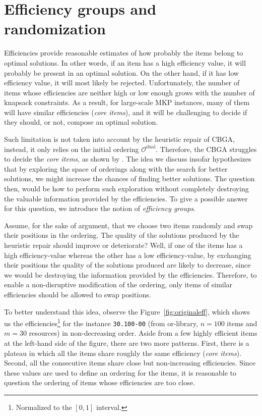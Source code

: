 \documentclass[3p,authoryear]{elsarticle}
\newcommand{\Ord}{\mathcal{O}}
\newcommand{\Orlib}{{\sc or-library}\xspace}
\begin{document}
\section{Efficiency groups and randomization}
Efficiencies provide reasonable estimates of how probably the items belong to optimal solutions. In other words, if an item has a high efficiency value, it will probably be present in an optimal solution. On the other hand, if it has low efficiency value, it will most likely be rejected. Unfortunately, the number of items whose efficiencies are neither high or low enough grows with the number of knapsack constraints. As a result, for large-scale \gls{MKP} instances, many of them will have similar efficiencies (\textit{core items}), and it will be challenging to decide if they should, or not, compose an optimal solution.


Such limitation is not taken into account by the heuristic repair of \gls{CBGA}, instead, it only relies on the initial ordering $\Ord^\text{dual}$. Therefore, the \gls{CBGA} struggles to decide the \textit{core items}, as shown by \cite{martins2014}. The idea we discuss insofar hypothesizes that by exploring the space of orderings along with the search for better solutions, we might increase the chances of finding better solutions. The question then, would be how to perform such exploration without completely destroying the valuable information provided by the efficiencies. To give a possible answer for this question, we introduce the notion of \textit{efficiency groups}.

Assume, for the sake of argument, that we choose two items randomly and swap their positions in the ordering. The quality of the solutions produced by the heuristic repair should improve or deteriorate? Well, if one of the items has a high efficiency-value whereas the other has a low efficiency-value, by exchanging their positions the quality of the solutions produced are likely to decrease, since we would be destroying the information provided by the efficiencies. Therefore, to enable a non-disruptive modification of the ordering, only items of similar efficiencies should be allowed to swap positions. 

To better understand this idea, observe the Figure~\ref{fig:originaleff}, which shows us the efficiencies\footnote{Normalized to the $[0,1]$ interval.} for the instance \texttt{30.100-00} (from \Orlib, $n=100$ items and $m=30$ resources) in non-decreasing order. Aside from a few highly efficient items at the left-hand side of the figure, there are two more patterns. First, there is a plateau in which all the items share roughly the same efficiency (\textit{core items}). Second, all the consecutive items share close but non-increasing efficiencies. Since these values are used to define an ordering for the items, it is reasonable to question the ordering of items whose efficiencies are too close. 
\end{document}
